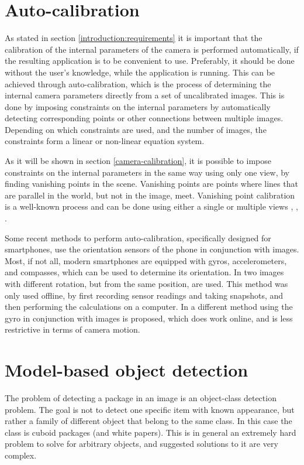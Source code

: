 \section{Auto-calibration} \label{related_work:vanishing_point_calibration} 
%
%
%
%
As stated in section \ref{introduction:requirements} it is important that the calibration of the internal parameters of the camera is performed automatically, if the resulting application is to be convenient to use.
Preferably, it should be done without the user's knowledge, while the application is running.
This can be achieved through auto-calibration, which is the process of determining the internal camera parameters directly from a set of uncalibrated images.
This is done by imposing constraints on the internal parameters by automatically detecting corresponding points or other connections between multiple images. 
Depending on which constraints are used, and the number of images, the constraints form a linear or non-linear equation system. \cite[458-469]{hartley-zisserman}

As it will be shown in section \ref{camera-calibration}, it is possible to impose constraints on the internal parameters in the same way using only one view, by finding vanishing points in the scene.
Vanishing points are points where lines that are parallel in the world, but not in the image, meet.
Vanishing point calibration is a well-known process and can be done using either a single or multiple views \cite{guillou2000using}, \cite[195-226]{hartley-zisserman}, \cite{caprile1990using}.

Some recent methods to perform auto-calibration, specifically designed for smartphones, use the orientation sensors of the phone in conjunction with images.
Most, if not all, modern  smartphones are equipped with gyros, accelerometers, and compasses, which can be used to determine its orientation.
In \cite{saponaro2013towards} two images with different rotation, but from the same position, are used.
This method was only used offline, by first recording sensor readings and taking snapshots, and then performing the calculations on a computer. %
In \cite{jia2014online} a different method using the gyro in conjunction with images is proposed, which does work online, and is less restrictive in terms of camera motion.

\section{Model-based object detection} \label{related_work:object_detection}
The problem of detecting a package in an image is an object-class detection problem.
The goal is not to detect one specific item with known appearance, but rather a family of different object that belong to the same class.
In this case the class is cuboid packages (and white papers).
This is in general an extremely hard problem to solve for arbitrary objects, and suggested solutions to it are very complex.

